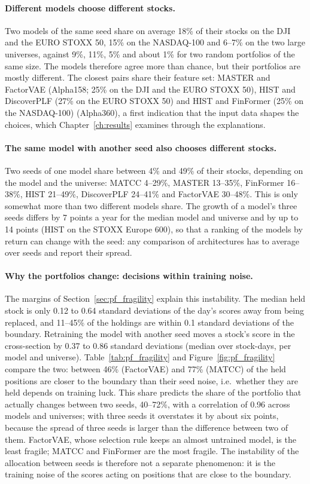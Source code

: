 \paragraph{Different models choose different stocks.} Two models of the same seed share on average 18\% of their stocks on the DJI and the EURO STOXX 50, 15\% on the NASDAQ-100 and 6--7\% on the two large universes, against 9\%, 11\%, 5\% and about 1\% for two random portfolios of the same size. The models therefore agree more than chance, but their portfolios are mostly different. The closest pairs share their feature set: MASTER and FactorVAE (Alpha158; 25\% on the DJI and the EURO STOXX 50), HIST and DiscoverPLF (27\% on the EURO STOXX 50) and HIST and FinFormer (25\% on the NASDAQ-100) (Alpha360), a first indication that the input data shapes the choices, which Chapter~\ref{ch:results} examines through the explanations.

\paragraph{The same model with another seed also chooses different stocks.} Two seeds of one model share between 4\% and 49\% of their stocks, depending on the model and the universe: MATCC 4--29\%, MASTER 13--35\%, FinFormer 16--38\%, HIST 21--49\%, DiscoverPLF 24--41\% and FactorVAE 30--48\%. This is only somewhat more than two different models share. The growth of a model's three seeds differs by 7 points a year for the median model and universe and by up to 14 points (HIST on the STOXX Europe 600), so that a ranking of the models by return can change with the seed: any comparison of architectures has to average over seeds and report their spread.

\paragraph{Why the portfolios change: decisions within training noise.} The margins of Section~\ref{sec:pf_fragility} explain this instability. The median held stock is only 0.12 to 0.64 standard deviations of the day's scores away from being replaced, and 11--45\% of the holdings are within 0.1 standard deviations of the boundary. Retraining the model with another seed moves a stock's score in the cross-section by 0.37 to 0.86 standard deviations (median over stock-days, per model and universe). Table~\ref{tab:pf_fragility} and Figure~\ref{fig:pf_fragility} compare the two: between 46\% (FactorVAE) and 77\% (MATCC) of the held positions are closer to the boundary than their seed noise, i.e.\ whether they are held depends on training luck. This share predicts the share of the portfolio that actually changes between two seeds, 40--72\%, with a correlation of 0.96 across models and universes; with three seeds it overstates it by about six points, because the spread of three seeds is larger than the difference between two of them. FactorVAE, whose selection rule keeps an almost untrained model, is the least fragile; MATCC and FinFormer are the most fragile. The instability of the allocation between seeds is therefore not a separate phenomenon: it is the training noise of the scores acting on positions that are close to the boundary.

